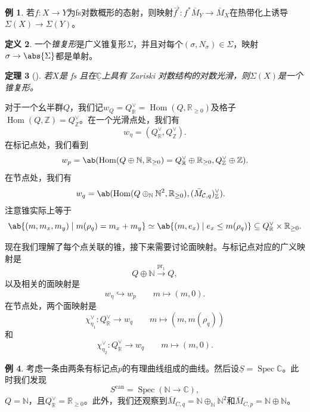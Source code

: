\documentclass{amsart}
\newtheorem{thm}{定理}[section]
\theoremstyle{definition}
\newtheorem{defn}[thm]{定义}
\newtheorem{exm}[thm]{例}
\theoremstyle{remark}
\theoremstyle{plain}
\theoremstyle{definition}
\theoremstyle{remark}
\newcommand{\N}{\mathbb{N}}
\newcommand{\R}{\mathbb{R}}
\newcommand{\C}{\mathbb{C}}
\newcommand{\Z}{\mathbb{Z}}
\newcommand{\mc}[1]{\mathcal{#1}}
\newcommand{\on}[1]{\operatorname{#1}}
\newcommand{\ul}[1]{\underline{#1}}
\newcommand{\1}{\mathbf{1}}
\newcommand{\2}{\mathbf{2}}
\newcommand{\3}{\mathbf{3}}
\DeclareMathOperator{\Hom}{Hom}
\DeclareMathOperator{\Spec}{Spec}
\begin{document}
\begin{exm}
    若\(f \colon X \to Y\)为fs对数概形的态射，则映射\(\bar{f}^{\flat} \colon f^* \bar{M}_Y \to \bar{M}_X\)在热带化上诱导\(\Sigma(X) \to \Sigma(Y)\)。
\end{exm}

\begin{defn}
    一个\textit{锥复形}是广义锥复形\(\Sigma\)，并且对每个\((\sigma, N_{\sigma}) \in \Sigma\)，映射\(\sigma \to \abs{\Sigma}\)都是单射。
\end{defn}

\begin{thm}[{\cite{ACP2015}}]
若\(X\)是 fs 且在\(\ul{\C}\)上具有 Zariski 对数结构的对数光滑，则\(\Sigma(X)\)是一个锥复形。
\end{thm}

对于一个幺半群\(Q\)，我们记\(w_Q = Q_{\R}^{\vee} = \Hom(Q, \R_{\geq 0})\)及格子\(\Hom(Q, \Z) = Q_{\Z}^{\vee}\)。在一个光滑点处，我们有
\[ w_{\eta} = (Q_{\R}^{\vee}, Q_{\Z}^{\vee}). \]
在标记点处，我们看到
\[ w_p = \ab(\Hom (Q \oplus \N, \R_{\geq 0}) = Q_{\R}^{\vee} \oplus \R_{\geq 0}, Q_{\Z}^{\vee}\oplus \Z). \]
在节点处，我们有
\begin{align*}
    w_q &= \ab(\Hom(Q \oplus_{\N} \N^2, \R_{\geq 0}), ( \bar{M}_{\mc{C}, q} )_{\Z}^{\vee}).
\end{align*}
注意锥实际上等于
\[ \ab\{(m, m_x, m_y) \mid m(\rho_q) = m_x + m_y \} \simeq \ab\{(m, e_x) \mid e_x \leq m(\rho_q) \} \subseteq Q_{\R}^{\vee} \times \R_{\geq 0}. \]

现在我们理解了每个点关联的锥，接下来需要讨论面映射。与标记点对应的广义映射是
\[ Q \oplus \N \xrightarrow{\on{pr}_1} Q, \]
以及相关的面映射是
\[ w_{\eta} \hookrightarrow w_p \qquad m \mapsto (m,0). \]
在节点处，两个面映射是
\[ \chi_{\eta_1}^{\vee} \colon Q_{\R}^{\vee} \to w_q \qquad m \mapsto (m, m(\rho_q)) \]
和
\[ \chi_{\eta_2}^{\vee} \colon Q_{\R}^{\vee} \to w_q \qquad m \mapsto (m, 0). \]

\begin{exm}
    考虑一条由两条有标记点\(p\)的有理曲线组成的曲线。然后设\(\ul{S} = \Spec \C\)。此时我们发现
    \[ S^{\on{can}} = \Spec(\N \to \C), \]
    \(Q = \N\)，且\(Q_{\R}^{\vee} = \R_{\geq 0}\)。此外，我们还观察到\(\bar{M}_{C, q} = \N \oplus_{\N} \N^2\)和\(\bar{M}_{C, p} = \N \oplus \N\)。
\end{exm}
\end{document}

